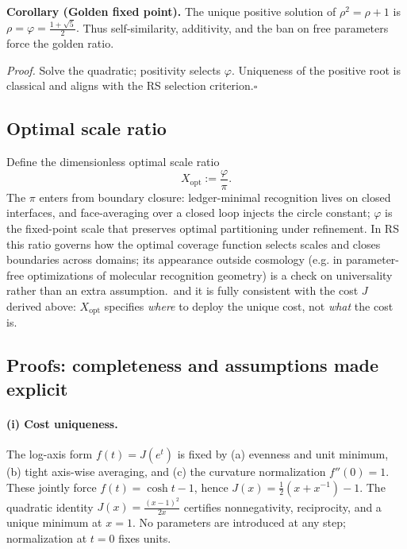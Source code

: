 \documentclass[11pt]{article}
\theoremstyle{definition}
\theoremstyle{remark}
\begin{document}
\medskip
\noindent\textbf{Corollary (Golden fixed point).}
The unique positive solution of \(\rho^2=\rho+1\) is
\(
  \rho=\varphi=\tfrac{1+\sqrt{5}}{2}.
\)
Thus self-similarity, additivity, and the ban on free parameters force the golden ratio.

\emph{Proof.}
Solve the quadratic; positivity selects \(\varphi\).
Uniqueness of the positive root is classical and aligns with the RS selection criterion.\(\square\)
%
%

\subsection{Optimal scale ratio}
Define the dimensionless optimal scale ratio
\[
  X_{\mathrm{opt}}:=\frac{\varphi}{\pi}.
\]
The \(\pi\) enters from boundary closure: ledger-minimal recognition lives on closed interfaces, and face-averaging over a closed loop injects the circle constant; \(\varphi\) is the fixed-point scale that preserves optimal partitioning under refinement. In RS this ratio governs how the optimal coverage function selects scales and closes boundaries across domains; its appearance outside cosmology (e.g. in parameter-free optimizations of molecular recognition geometry) is a check on universality rather than an extra assumption.\, %
and it is fully consistent with the cost \(J\) derived above: \(X_{\mathrm{opt}}\) specifies \emph{where} to deploy the unique cost, not \emph{what} the cost is.

\subsection*{Proofs: completeness and assumptions made explicit}
\paragraph{(i) Cost uniqueness.}
The log-axis form \(f(t)=J(e^t)\) is fixed by (a) evenness and unit minimum, (b) tight axis-wise averaging, and (c) the curvature normalization \(f''(0)=1\). These jointly force \(f(t)=\cosh t-1\), hence \(J(x)=\frac12(x+x^{-1})-1\). The quadratic identity \(J(x)=\frac{(x-1)^2}{2x}\) certifies nonnegativity, reciprocity, and a unique minimum at \(x=1\). No parameters are introduced at any step; normalization at \(t=0\) fixes units. %
\end{document}
